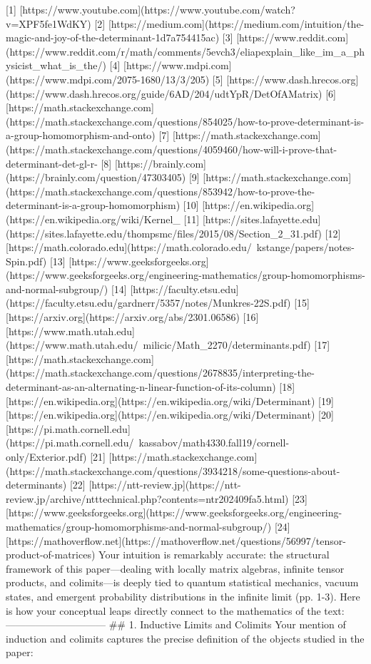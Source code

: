 [1] [https://www.youtube.com](https://www.youtube.com/watch?v=XPF5fe1WdKY)
[2] [https://medium.com](https://medium.com/intuition/the-magic-and-joy-of-the-determinant-1d7a754415ac)
[3] [https://www.reddit.com](https://www.reddit.com/r/math/comments/5evch3/eliapexplain_like_im_a_physicist_what_is_the/)
[4] [https://www.mdpi.com](https://www.mdpi.com/2075-1680/13/3/205)
[5] [https://www.dash.hrecos.org](https://www.dash.hrecos.org/guide/6AD/204/udtYpR/DetOfAMatrix)
[6] [https://math.stackexchange.com](https://math.stackexchange.com/questions/854025/how-to-prove-determinant-is-a-group-homomorphism-and-onto)
[7] [https://math.stackexchange.com](https://math.stackexchange.com/questions/4059460/how-will-i-prove-that-determinant-det-gl-r-%
[8] [https://brainly.com](https://brainly.com/question/47303405)
[9] [https://math.stackexchange.com](https://math.stackexchange.com/questions/853942/how-to-prove-the-determinant-is-a-group-homomorphism)
[10] [https://en.wikipedia.org](https://en.wikipedia.org/wiki/Kernel_%
[11] [https://sites.lafayette.edu](https://sites.lafayette.edu/thompsmc/files/2015/08/Section_2_31.pdf)
[12] [https://math.colorado.edu](https://math.colorado.edu/~kstange/papers/notes-Spin.pdf)
[13] [https://www.geeksforgeeks.org](https://www.geeksforgeeks.org/engineering-mathematics/group-homomorphisms-and-normal-subgroup/)
[14] [https://faculty.etsu.edu](https://faculty.etsu.edu/gardnerr/5357/notes/Munkres-22S.pdf)
[15] [https://arxiv.org](https://arxiv.org/abs/2301.06586)
[16] [https://www.math.utah.edu](https://www.math.utah.edu/~milicic/Math_2270/determinants.pdf)
[17] [https://math.stackexchange.com](https://math.stackexchange.com/questions/2678835/interpreting-the-determinant-as-an-alternating-n-linear-function-of-its-column)
[18] [https://en.wikipedia.org](https://en.wikipedia.org/wiki/Determinant)
[19] [https://en.wikipedia.org](https://en.wikipedia.org/wiki/Determinant)
[20] [https://pi.math.cornell.edu](https://pi.math.cornell.edu/~kassabov/math4330.fall19/cornell-only/Exterior.pdf)
[21] [https://math.stackexchange.com](https://math.stackexchange.com/questions/3934218/some-questions-about-determinants)
[22] [https://ntt-review.jp](https://ntt-review.jp/archive/ntttechnical.php?contents=ntr202409fa5.html)
[23] [https://www.geeksforgeeks.org](https://www.geeksforgeeks.org/engineering-mathematics/group-homomorphisms-and-normal-subgroup/)
[24] [https://mathoverflow.net](https://mathoverflow.net/questions/56997/tensor-product-of-matrices)
Your intuition is remarkably accurate: the structural framework of this paper—dealing with locally matrix algebras, infinite tensor products, and colimits—is deeply tied to quantum statistical mechanics, vacuum states, and emergent probability distributions in the infinite limit (pp. 1-3).
Here is how your conceptual leaps directly connect to the mathematics of the text:
------------------------------
## 1. Inductive Limits and Colimits
Your mention of induction and colimits captures the precise definition of the objects studied in the paper:

